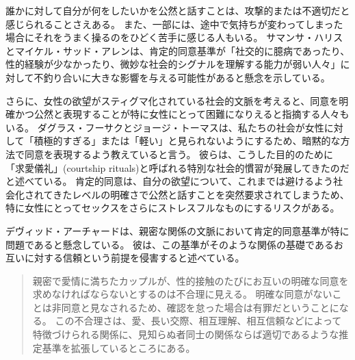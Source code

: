 \documentclass[paper=a4,book,openany]{jlreq}
\newcommand{\ig}[1]{}           %
\begin{document}
誰かに対して自分が何をしたいかを公然と話すことは、攻撃的または不適切だと感じられることさえある。
また、一部には、途中で気持ちが変わってしまった場合にそれをうまく操るのをひどく苦手に感じる人もいる。
サマンサ・ハリス\ig{Samantha Harris}とマイケル・サッド・アレン\ig{Michael Thad Allen}は、肯定的同意基準が「社交的に臆病であったり、性的経験が少なかったり、微妙な社会的シグナルを理解する能力が弱い人々」に対して不釣り合いに大きな影響を与える可能性があると懸念を示している\citep{harris20:_bad_vibrat}。

さらに、女性の欲望がスティグマ化されている社会的文脈を考えると、同意を明確かつ公然と表現することが特に女性にとって困難になりえると指摘する人々もいる。
ダグラス・フーサク\ig{Douglas Husak}とジョージ・トーマス\ig{George C. Thomas}は、私たちの社会が女性に対して「積極的すぎる」または「軽い」と見られないようにするため、暗黙的な方法で同意を表現するよう教えていると言う。
彼らは、こうした目的のために「求愛儀礼」(courtship rituals)と呼ばれる特別な社会的慣習が発展してきたのだと述べている。
肯定的同意は、自分の欲望について、これまでは避けるよう社会化されてきたレベルの明確さで公然と話すことを突然要求されてしまうため、特に女性にとってセックスをさらにストレスフルなものにするリスクがある\citep{husak92:_date}。

デヴィッド・アーチャードは、親密な関係の文脈において肯定的同意基準が特に問題であると懸念している。
彼は、この基準がそのような関係の基礎であるお互いに対する信頼という前提を侵害すると述べている。

\begin{quote}
親密で愛情に満ちたカップルが、性的接触のたびにお互いの明確な同意を求めなければならないとするのは不合理に見える。
明確な同意がないことは非同意と見なされるため、確認を怠った場合は有罪だということになる。
この不合理さは、愛、長い交際、相互理解、相互信頼などによって特徴づけられる関係に、見知らぬ者同士の関係ならば適切であるような推定基準を拡張しているところにある。
\citep[p.146]{archard98:_sexual_consen}
\end{quote}
\end{document}
